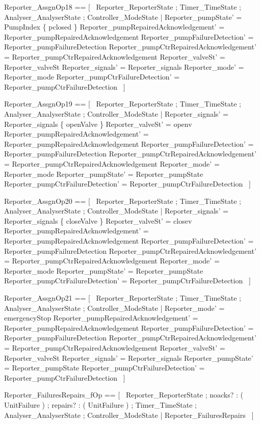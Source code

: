 \documentclass{article}
\begin{document}
\begin{zed}
	Reporter\_AssgnOp18 == [~  \Delta Reporter\_ReporterState ; \Xi Timer\_TimeState ; \Xi Analyser\_AnalyserState ; \Xi Controller\_ModeState | Reporter\_pumpState' = PumpIndex \cross \{ pclosed \} \land Reporter\_pumpRepairedAcknowledgement' = Reporter\_pumpRepairedAcknowledgement \land Reporter\_pumpFailureDetection' = Reporter\_pumpFailureDetection \land Reporter\_pumpCtrRepairedAcknowledgement' = Reporter\_pumpCtrRepairedAcknowledgement \land Reporter\_valveSt' = Reporter\_valveSt \land Reporter\_signals' = Reporter\_signals \land Reporter\_mode' = Reporter\_mode \land Reporter\_pumpCtrFailureDetection' = Reporter\_pumpCtrFailureDetection  ~]
\end{zed}

\begin{zed}
	Reporter\_AssgnOp19 == [~  \Delta Reporter\_ReporterState ; \Xi Timer\_TimeState ; \Xi Analyser\_AnalyserState ; \Xi Controller\_ModeState | Reporter\_signals' = Reporter\_signals \cup \{ openValve \} \land Reporter\_valveSt' = openv \land Reporter\_pumpRepairedAcknowledgement' = Reporter\_pumpRepairedAcknowledgement \land Reporter\_pumpFailureDetection' = Reporter\_pumpFailureDetection \land Reporter\_pumpCtrRepairedAcknowledgement' = Reporter\_pumpCtrRepairedAcknowledgement \land Reporter\_mode' = Reporter\_mode \land Reporter\_pumpState' = Reporter\_pumpState \land Reporter\_pumpCtrFailureDetection' = Reporter\_pumpCtrFailureDetection  ~]
\end{zed}

\begin{zed}
	Reporter\_AssgnOp20 == [~  \Delta Reporter\_ReporterState ; \Xi Timer\_TimeState ; \Xi Analyser\_AnalyserState ; \Xi Controller\_ModeState | Reporter\_signals' = Reporter\_signals \cup \{ closeValve \} \land Reporter\_valveSt' = closev \land Reporter\_pumpRepairedAcknowledgement' = Reporter\_pumpRepairedAcknowledgement \land Reporter\_pumpFailureDetection' = Reporter\_pumpFailureDetection \land Reporter\_pumpCtrRepairedAcknowledgement' = Reporter\_pumpCtrRepairedAcknowledgement \land Reporter\_mode' = Reporter\_mode \land Reporter\_pumpState' = Reporter\_pumpState \land Reporter\_pumpCtrFailureDetection' = Reporter\_pumpCtrFailureDetection  ~]
\end{zed}

\begin{zed}
	Reporter\_AssgnOp21 == [~  \Delta Reporter\_ReporterState ; \Xi Timer\_TimeState ; \Xi Analyser\_AnalyserState ; \Xi Controller\_ModeState | Reporter\_mode' = emergencyStop \land Reporter\_pumpRepairedAcknowledgement' = Reporter\_pumpRepairedAcknowledgement \land Reporter\_pumpFailureDetection' = Reporter\_pumpFailureDetection \land Reporter\_pumpCtrRepairedAcknowledgement' = Reporter\_pumpCtrRepairedAcknowledgement \land Reporter\_valveSt' = Reporter\_valveSt \land Reporter\_signals' = Reporter\_signals \land Reporter\_pumpState' = Reporter\_pumpState \land Reporter\_pumpCtrFailureDetection' = Reporter\_pumpCtrFailureDetection  ~]
\end{zed}

\begin{zed}
	Reporter\_FailuresRepairs\_fOp == [~  \Xi Reporter\_ReporterState ; noacks? : ( \power UnitFailure ) ; repairs? : ( \power UnitFailure ) ; \Xi Timer\_TimeState ; \Xi Analyser\_AnalyserState ; \Xi Controller\_ModeState | \lnot \pre Reporter\_FailuresRepairs  ~]
\end{zed}
\end{document}
